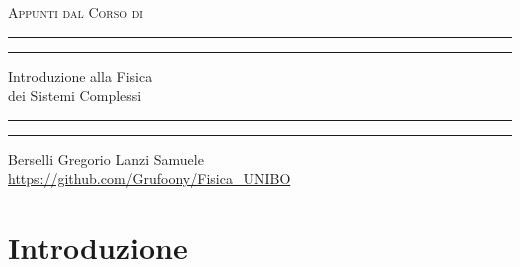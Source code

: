\documentclass[12pt, a4paper]{book}
\theoremstyle{theorem}
\begin{document}
	\begin{titlepage}
		\centering %
		\scshape %
		Appunti dal Corso di
		\vspace*{1.5\baselineskip} %
		
		
		
		\rule{13cm}{1.6pt}\vspace*{-\baselineskip}\vspace*{2pt} %
		\rule{13cm}{0.4pt} %
		
		\vspace{0.75\baselineskip} %
		{ \Huge Introduzione alla Fisica\\
		\vspace{4mm}
		dei Sistemi Complessi \\ }
		\vspace{0.75\baselineskip} %
		\rule{13cm}{0.4pt}\vspace*{-\baselineskip}\vspace{3.2pt} %
		\rule{13cm}{1.6pt} %
		
		\vspace{1.75\baselineskip} %
		{}
		Berselli Gregorio \quad Lanzi Samuele
		\\\url{https://github.com/Grufoony/Fisica_UNIBO}
		\vfill
	\end{titlepage}
	\tableofcontents
	\chapter{Introduzione} %
\end{document}
